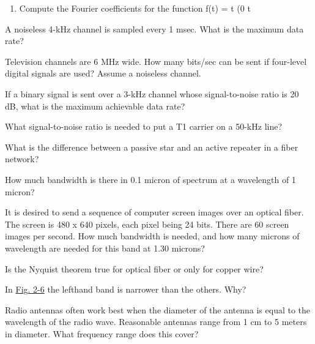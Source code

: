 \documentclass[b5paper,11pt]{memoir}
\begin{document}
{}

\begin{enumerate}
\def\labelenumi{\arabic{enumi}.}
\item
  {}

Compute the Fourier coefficients for the function {f}({t}) = {t} (0
{t}
\end{enumerate}

{}

A noiseless 4-kHz channel is sampled every 1 msec. What is the maximum
data rate?

{}

Television channels are 6 MHz wide. How many bits/sec can be sent if
four-level digital signals are used? Assume a noiseless channel.

{}

If a binary signal is sent over a 3-kHz channel whose signal-to-noise
ratio is 20 dB, what is the maximum achievable data rate?

{}

What signal-to-noise ratio is needed to put a T1 carrier on a 50-kHz
line?

{}

What is the difference between a passive star and an active repeater in
a fiber network?

{}

How much bandwidth is there in 0.1 micron of spectrum at a wavelength of
1 micron?

{}

It is desired to send a sequence of computer screen images over an
optical fiber. The screen is 480 x 640 pixels, each pixel being 24 bits.
There are 60 screen images per second. How much bandwidth is needed, and
how many microns of wavelength are needed for this band at 1.30 microns?

{}

Is the Nyquist theorem true for optical fiber or only for copper wire?

{}

In
\protect\hyperlink{0130661023_ch02lev1sec2.htmlux5cux23ch02fig06}{Fig.
2-6} the lefthand band is narrower than the others. Why?

{}

Radio antennas often work best when the diameter of the antenna is equal
to the wavelength of the radio wave. Reasonable antennas range from 1 cm
to 5 meters in diameter. What frequency range does this cover?

{}
\end{document}
